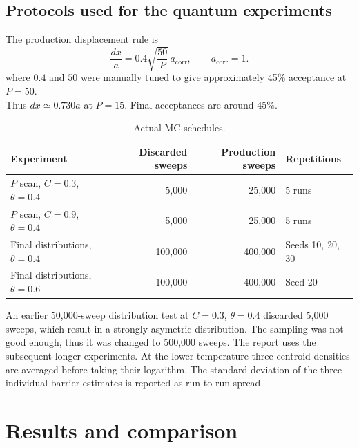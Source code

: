\documentclass[11pt,a4paper]{report}
\begin{document}
\section{Protocols used for the quantum experiments}
The production displacement rule is
\begin{equation}
\frac{dx}{a}=0.4\sqrt{\frac{50}{P}}\,a_{\mathrm{corr}},\qquad a_{\mathrm{corr}}=1.
\end{equation}
where $0.4$ and $50$ were manually tuned to give approximately 45\% acceptance at $P=50$.\\
Thus $dx\simeq0.730a$ at $P=15$. Final acceptances are around 45\%.
\begin{table}[H]
\centering\small
\begin{tabular}{lrrl}
\toprule
Experiment & Discarded sweeps & Production sweeps & Repetitions\\
\midrule
$P$ scan, $C=0.3$, $\theta=0.4$ & 5,000 & 25,000 & 5 runs\\
$P$ scan, $C=0.9$, $\theta=0.4$ & 5,000 & 25,000 & 5 runs\\
Final distributions, $\theta=0.4$ & 100,000 & 400,000 & Seeds 10, 20, 30\\
Final distributions, $\theta=0.6$ & 100,000 & 400,000 & Seed 20\\
\bottomrule
\end{tabular}
\caption{Actual MC schedules.}
\label{tab:schedules}
\end{table}
An earlier 50,000-sweep distribution test at $C=0.3$, $\theta=0.4$ discarded 5,000 sweeps, which result in a strongly asymetric distribution. The sampling was not good enough, thus it was changed to 500,000 sweeps. The report uses the subsequent longer experiments. At the lower temperature three centroid densities are averaged before taking their logarithm. The standard deviation of the three individual barrier estimates is reported as run-to-run spread.

\chapter{Results and comparison}
\end{document}
